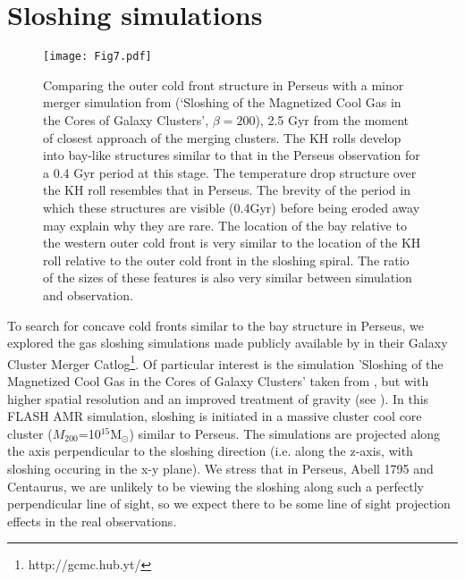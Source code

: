 \documentclass[useAMS,usenatbib]{mn2e}
\begin{document}
\section{Sloshing simulations}
\label{sec:sloshsim}
\begin{figure*}
  \begin{center}
    \leavevmode
\texttt{[image: Fig7.pdf]}
      \caption{Comparing the outer cold front structure in Perseus with a minor
merger simulation from \citet{ZuHone2016} (`Sloshing of the Magnetized Cool Gas
in the Cores of Galaxy Clusters', $\beta=200$), 2.5 Gyr from the moment of closest approach of the merging clusters. The KH rolls develop into bay-like structures similar to that in the
Perseus observation for a 0.4 Gyr period at this stage. The temperature drop
structure over the KH roll resembles that in Perseus. The brevity of the period in
which these structures are visible (0.4Gyr) before being eroded away may explain
why they are rare. The location of the bay relative to the western outer cold
front is very similar to the location of the KH roll relative to the outer cold
front in the sloshing spiral. The ratio of the sizes of these features is also
very similar between simulation and observation. }
      \label{perseus_comparetobeta200}
  \end{center}
\end{figure*}
To search for concave cold fronts similar to the bay structure in Perseus, we
explored the gas sloshing simulations made publicly available by
\citet{ZuHone2016} in their Galaxy Cluster Merger
Catlog\footnote{http://gcmc.hub.yt/}. Of particular interest is the simulation
'Sloshing of the Magnetized Cool Gas in the Cores of Galaxy Clusters' taken from
\citet{ZuHone2011}, but with higher spatial resolution and an improved treatment
of gravity (see \citealt{Roediger2012b}). In this FLASH AMR simulation, sloshing is
initiated in a massive cluster cool core cluster
($M_{200}$=10$^{15}$M$_{\odot}$) similar to Perseus. The simulations are projected along the axis 
perpendicular to the sloshing direction (i.e. along the z-axis, with sloshing occuring in the x-y plane). We stress that in Perseus, Abell 1795 and Centaurus,
we are unlikely to be viewing the sloshing along such a perfectly perpendicular line of sight, so we expect there to be some line of 
sight projection effects in the real observations.  
\end{document}
